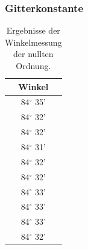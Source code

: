 \documentclass[12pt,a4paper]{article}
\begin{document}
	\subsubsection{Gitterkonstante}
	
	\begin{table}
		\begin{center}
			\begin{tabular}{|c|}
				\hline
				Winkel \\
				\hline
				84$^{\circ}$ 35'\\
				\hline
				84$^{\circ}$ 32'\\
				\hline
				84$^{\circ}$ 32'\\
				\hline
				84$^{\circ}$ 31'\\
				\hline
				84$^{\circ}$ 32'\\
				\hline
				84$^{\circ}$ 32'\\
				\hline
				84$^{\circ}$ 33'\\
				\hline
				84$^{\circ}$ 33'\\
				\hline
				84$^{\circ}$ 33'\\
				\hline
				84$^{\circ}$ 32'\\
				\hline
			\end{tabular}
			\caption{Ergebnisse der Winkelmessung der nullten Ordnung.}
			\label{tab:RohdatenRauschmessungGitter}
		\end{center}
	\end{table}
	
\end{document}
